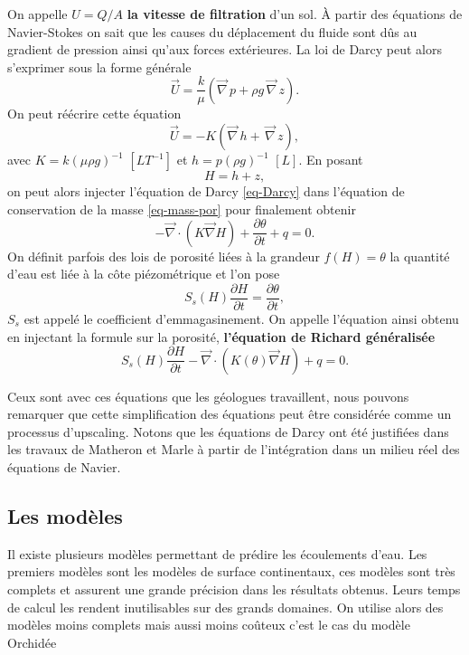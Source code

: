 \documentclass[a4paper,10pt]{article}
\begin{document}
	On appelle $U=Q/A$ \textbf{la vitesse de filtration} d'un sol. À partir des équations de Navier-Stokes on sait que les causes du déplacement du fluide sont dûs au gradient de pression ainsi qu'aux forces extérieures. La loi de Darcy peut alors s'exprimer sous la forme générale
	\begin{equation}
		\label{eq-Darcy}
		\overrightarrow{U}=\frac{k}{\mu }(\overrightarrow{\nabla}\, p+\rho g \,\overrightarrow{\nabla}\, z).
	\end{equation} 
	On peut réécrire cette équation
	\[\overrightarrow{U}=-K(\overrightarrow{\nabla}\, h + \,\overrightarrow{\nabla}\, z),\]
	avec $K=k(\mu \rho g)^{-1}$ $[LT^{-1}]$ et $h=p(\rho g)^{-1}$ $[L]$. En posant 
	\[H=h+z,\]
	on peut alors injecter l'équation de Darcy \eqref{eq-Darcy} dans l'équation de conservation de la masse \eqref{eq-mass-por} pour finalement obtenir
	\begin{equation}
		\label{eq-Richards}
		-\overrightarrow{\nabla} \cdot (K\overrightarrow{\nabla}H)+\frac{\partial\theta}{\partial t}+ q=0.
	\end{equation}  
	On définit parfois des lois de porosité liées à la grandeur $f(H)=\theta$ la quantité d'eau est liée à la côte piézométrique et l'on pose 
	\[S_s(H)\frac{\partial H}{\partial t}=\frac{\partial\theta}{\partial t},\]
	$S_s$ est appelé le coefficient d'emmagasinement. On appelle l'équation ainsi obtenu en injectant la formule sur la porosité, \textbf{l'équation de Richard généralisée}
	\begin{equation}
		\label{eq-ge-richard}
		S_s(H)\frac{\partial H}{\partial t}-\overrightarrow{\nabla} \cdot (K(\theta)\overrightarrow{\nabla}H)+q=0.
	\end{equation}
	
	Ceux sont avec ces équations que les géologues travaillent, nous pouvons remarquer que cette simplification des équations peut être considérée comme un processus d'upscaling. Notons que les équations de Darcy ont été justifiées dans les travaux de Matheron et Marle à partir de l'intégration dans un milieu réel des équations de Navier. 
	
	
	\subsection{Les modèles}
	Il existe plusieurs modèles permettant de prédire les écoulements d'eau. Les premiers modèles sont les modèles de surface continentaux, ces modèles sont très complets et assurent une grande précision dans les résultats obtenus. Leurs temps de calcul les rendent inutilisables sur des grands domaines. On utilise alors des modèles moins complets mais aussi moins coûteux c'est le cas du modèle Orchidée 
	
\end{document}

